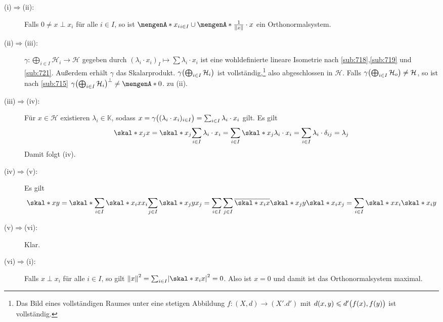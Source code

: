 \begin{description}
	\item[(i)$\Rightarrow$(ii):] Falls $0 \not= x \perp x_i$ für alle $i \in I$, so ist $\set{x_i}_{i \in I} \cup \set{\frac{1}{\norm{x}} \cdot x}$ ein Orthonormalsystem. 
	\light
	\item[(ii)$\Rightarrow$(iii):] $\gamma \colon \bigoplus_{i \in I} \mathcal{H}_i \to \mathcal{H}$ gegeben durch 
	$(\lambda_i \cdot x_i)_I \mapsto \sum \lambda_i \cdot x_i$ ist eine wohldefinierte lineare Isometrie nach \ref{sub:718},\ref{sub:719} und \ref{sub:721}. Außerdem erhält 
	$\gamma$ das Skalarprodukt. $\gamma \enbrace*{\bigoplus_{i \in I} \mathcal{H}_i}$ ist vollständig,\footnote{Das Bild eines vollständigen Raumes unter eine stetigen 
	Abbildung $f \colon (X,d) \to (X'.d')$ mit $d(x,y) \le d'\enbrace[\big]{f(x),f(y)}$ ist vollständig.}
	also abgeschlossen in $\mathcal{H}$. Falls $\gamma \enbrace*{\bigoplus_{i\in I} \mathcal{H}_o} \not= \mathcal{H}$, so ist nach \ref{sub:715} 
	$\gamma \enbrace*{\bigoplus_{i \in I} \mathcal{H}_i}^\bot \not= \set{0}$. \light zu (ii). 
	\item[(iii)$\Rightarrow$(iv):] Für $x \in \mathcal{H}$ existieren $\lambda_i \in \mathds{K}$,  sodass 
	$x= \gamma \enbrace[\big]{(\lambda_i \cdot x_i)_{i \in I}} = \sum_{i \in I} \lambda_i \cdot x_i$ gilt. Es gilt 
	\begin{align*}
		\skal*{x_j}{x} = \skal*{x_j}{\sum_{i \in I} \lambda_i \cdot x_i} = \sum_{i \in I} \skal*{x_j}{\lambda_i \cdot x_i} = \sum_{i\in I} \lambda_i \cdot \delta_{ij} = \lambda_j
	\end{align*}
	Damit folgt (iv).
	\item[(iv)$\Rightarrow$(v):] Es gilt
	\[
		\skal*{x}{y} = \skal*{\sum_{i \in I}\skal*{x_i}{x} x_i}{\sum_{j \in I} \skal*{x_j}{y} x_j} = 
		\sum_{i \in I} \sum_{j \in I} \overline{\skal*{x_i}{x}} \skal*{x_j}{y} \skal*{x_i}{x_j} = \sum_{i \in I} \skal*{x}{x_i} \skal*{x_i}{y}
	\]
	\item[(v)$\Rightarrow$(vi):] Klar.
	\item[(vi)$\Rightarrow$(i):] Falls $x \perp x_i$ für alle $i \in I$, so gilt $\norm{x}^2= \sum_{i \in I} \abs*{\skal*{x_i}{x}}^2 =0$. Also ist $x=0$ und damit ist das 
	Orthonormalsystem maximal. \bewende
\end{description}

